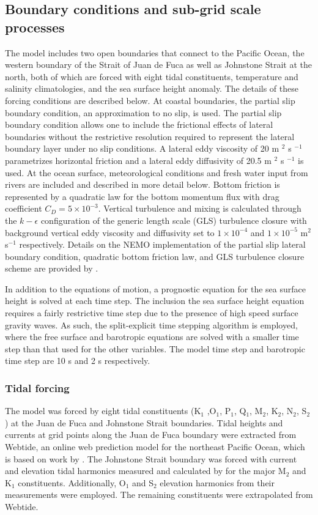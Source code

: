 \documentclass[pdftex,10pt]{article}
\begin{document}
\subsection{Boundary conditions and sub-grid scale processes}
The model includes two open boundaries that connect to the Pacific Ocean, the western boundary of the Strait of Juan de Fuca as well as Johnstone Strait at the north, both of which are forced with eight tidal constituents, temperature and salinity climatologies, and the sea surface height anomaly. The details of these forcing conditions are described below. At coastal boundaries, the partial slip boundary condition, an approximation to no slip, is used. The partial slip boundary condition allows one to include the frictional effects of lateral boundaries without the restrictive resolution required to represent the lateral boundary layer under no slip conditions. A lateral eddy viscosity of 20 m $^2$ s $^{-1}$ parametrizes horizontal friction and a lateral eddy diffusivity of 20.5 m $^2$ s $^{-1}$ is used. At the ocean surface, meteorological conditions and fresh water input from rivers are included and described in more detail below. Bottom friction is represented by a quadratic law for the bottom momentum flux with drag coefficient $C_D = 5\times 10^{-3}$. Vertical turbulence and mixing is calculated through the $k-\epsilon$ configuration of the generic length scale (GLS) turbulence closure \citep{umlauf2003generic} with background vertical eddy viscosity and diffusivity set to $1\times10^{-4}$ and $1\times10^{-5}$ m$^2$ s$^{-1}$ respectively. Details on the NEMO implementation of the partial slip lateral boundary condition, quadratic bottom friction law, and GLS turbulence closure scheme are provided by \citet{madec2008nemo}.

In addition to the equations of motion, a prognostic equation for the sea surface height is solved at each time step. The inclusion the sea surface height equation requires a fairly restrictive time step due to the presence of high speed surface gravity waves. As such, the split-explicit time stepping algorithm is employed, where the free surface and barotropic equations are solved with a smaller time step than that used for the other variables. The model time step and barotropic time step are 10 s and 2 s respectively. 


\subsubsection{Tidal forcing} 
The model was forced by eight tidal constituents (K$_1$ ,O$_1$, P$_1$, Q$_1$, M$_2$, K$_2$, N$_2$, S$_2$) at the Juan de Fuca and Johnstone Strait boundaries. Tidal heights and currents at grid points along the Juan de Fuca boundary were extracted from Webtide, an online web prediction model for the northeast Pacific Ocean, which is based on work by \citet{foreman2000webtide}. The Johnstone Strait boundary was forced with current and elevation tidal harmonics measured and calculated by \citet{thomson1980johnstone} for the major M$_2$ and K$_1$ constituents. Additionally, O$_1$ and S$_2$ elevation harmonics from their measurements were employed. The remaining constituents were extrapolated from Webtide. 
\end{document}
